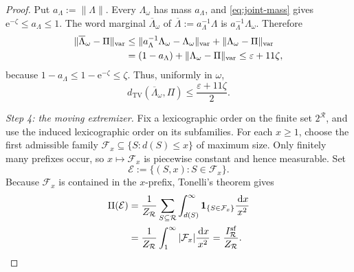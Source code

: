\documentclass[11pt]{article}
\numberwithin{equation}{section}
\theoremstyle{plain}
\newcommand{\1}{\mathbf 1}
\newcommand{\dd}{\,\mathrm d}
\newcommand{\e}{\mathrm e}
\newcommand{\eps}{\varepsilon}
\newcommand{\cR}{\mathcal R}
\newcommand{\TV}{\operatorname{TV}}
\begin{document}
\begin{proof}
Put $a_\Lambda:=\|\Lambda\|$.  Every $\Lambda_\omega$ has mass
$a_\Lambda$, and \eqref{eq:joint-mass} gives
$\e^{-\zeta}\le a_\Lambda\le1$.  The word marginal
$\overline\Lambda_\omega$ of
$\overline\Lambda:=a_\Lambda^{-1}\Lambda$ is
$a_\Lambda^{-1}\Lambda_\omega$.  Therefore
\begin{align}
 \|\overline\Lambda_\omega-\Pi\|_{\mathrm{var}}
 &\le
 \|a_\Lambda^{-1}\Lambda_\omega-\Lambda_\omega\|_{\mathrm{var}}
 +\|\Lambda_\omega-\Pi\|_{\mathrm{var}}\notag\\
 &=(1-a_\Lambda)+\|\Lambda_\omega-\Pi\|_{\mathrm{var}}
 \le\eps+11\zeta,                              \label{eq:normalized-prefix-TV}
\end{align}
because $1-a_\Lambda\le1-\e^{-\zeta}\le\zeta$.  Thus, uniformly in
$\omega$,
\begin{equation}\label{eq:normalized-prefix-distance}
 d_{\TV}(\overline\Lambda_\omega,\Pi)
 \le\frac{\eps+11\zeta}{2}.
\end{equation}

\smallskip
\noindent\emph{Step 4: the moving extremizer.}
Fix a lexicographic order on the finite set $2^{\cR}$, and use the induced
lexicographic order on its subfamilies.  For each $x\ge1$, choose the first
admissible family
$\mathcal F_x\subseteq\{S:d(S)\le x\}$ of maximum size.  Only finitely many
prefixes occur, so $x\mapsto\mathcal F_x$ is piecewise constant and hence
measurable.  Set
\[
 \mathcal E:=\{(S,x):S\in\mathcal F_x\}.
\]
Because $\mathcal F_x$ is contained in the $x$-prefix, Tonelli's theorem
gives
\begin{align}
 \Pi(\mathcal E)
 &=\frac1{Z_{\cR}}
   \sum_{S\subseteq\cR}\int_{d(S)}^\infty
      \1_{\{S\in\mathcal F_x\}}\frac{\dd x}{x^2}\notag\\
 &=\frac1{Z_{\cR}}\int_1^\infty
      |\mathcal F_x|\frac{\dd x}{x^2}
 =\frac{I_{\cR}^{\mathrm{sf}}}{Z_{\cR}}.       \label{eq:prefix-occupancy}
\end{align}


\end{proof}
\end{document}
